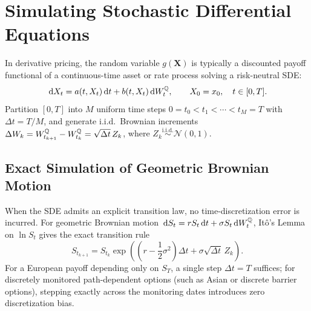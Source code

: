 \section{Simulating Stochastic Differential Equations}

In derivative pricing, the random variable $g(\mathbf{X})$ is typically a discounted payoff functional of a continuous-time asset or rate process solving a risk-neutral SDE:
\begin{equation}\label{eq:mc-sde}
\,\mathrm{d} X_t = a(t, X_t)\,\mathrm{d} t + b(t, X_t)\,\mathrm{d} W_t^{\mathbb{Q}}, \qquad X_0 = x_0, \quad t \in [0, T].
\end{equation}
Partition $[0, T]$ into $M$ uniform time steps $0 = t_0 < t_1 < \cdots < t_M = T$ with $\Delta t = T/M$, and generate i.i.d.\ Brownian increments $\Delta W_k = W_{t_{k+1}}^{\mathbb{Q}} - W_{t_k}^{\mathbb{Q}} = \sqrt{\Delta t}\,Z_k$, where $Z_k \stackrel{\text{i.i.d.}}{\sim} \mathcal{N}(0, 1)$.

\subsection*{Exact Simulation of Geometric Brownian Motion}
When the SDE admits an explicit transition law, no time-discretization error is incurred. For geometric Brownian motion $\,\mathrm{d} S_t = r S_t\,\mathrm{d} t + \sigma S_t\,\mathrm{d} W_t^{\mathbb{Q}}$, It\^o's Lemma on $\ln S_t$ gives the exact transition rule
\[
S_{t_{k+1}} = S_{t_k}\exp\!\left(\left(r - \frac{1}{2}\sigma^2\right)\Delta t + \sigma\sqrt{\Delta t}\,Z_k\right).
\]
For a European payoff depending only on $S_T$, a single step $\Delta t = T$ suffices; for discretely monitored path-dependent options (such as Asian or discrete barrier options), stepping exactly across the monitoring dates introduces zero discretization bias.

